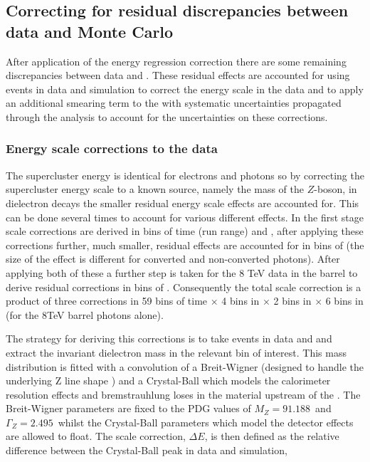 \subsection{Correcting for residual discrepancies between data and Monte Carlo}
\label{sec:scale_smearing}

After application of the energy regression correction there are some remaining discrepancies between data and \MC. These residual effects are accounted for using \Zee events in data and simulation to correct the energy scale in the data and to apply an additional smearing term to the \MC with systematic uncertainties propagated through the analysis to account for the uncertainties on these corrections.

\subsubsection{Energy scale corrections to the data}

The supercluster energy is identical for electrons and photons so by correcting the supercluster energy scale to a known source, namely the mass of the $Z$-boson, in dielectron decays the smaller residual energy scale effects are accounted for. This can be done several times to account for various different effects. In the first stage scale corrections are derived in bins of time (run range) and \eta, after applying these corrections further, much smaller, residual effects are accounted for in bins of \rnine (the size of the effect is different for converted and non-converted photons). After applying both of these a further step is taken for the 8 TeV data in the barrel to derive residual corrections in bins of \ET. Consequently the total scale correction is a product of three corrections in 59 bins of time $\times$ 4 bins in \eta $\times$ 2 bins in \rnine $\times$ 6 bins in \ET (for the 8TeV barrel photons alone).

The strategy for deriving this corrections is to take \Zee events in data and \MC and extract the invariant dielectron mass in the relevant bin of interest. This mass distribution is fitted with a convolution of a Breit-Wigner (designed to handle the underlying Z line shape ) and a Crystal-Ball which models the calorimeter resolution effects and bremstrauhlung loses in the material upstream of the \ECAL. The Breit-Wigner parameters are fixed to the PDG values of $M_{Z}=91.188$~\GeV and $\Gamma_{Z}=2.495$~\GeV {} whilst the Crystal-Ball parameters which model the detector effects are allowed to float. The scale correction, $\Delta E$, is then defined as the relative difference between the Crystal-Ball peak in data and simulation,

